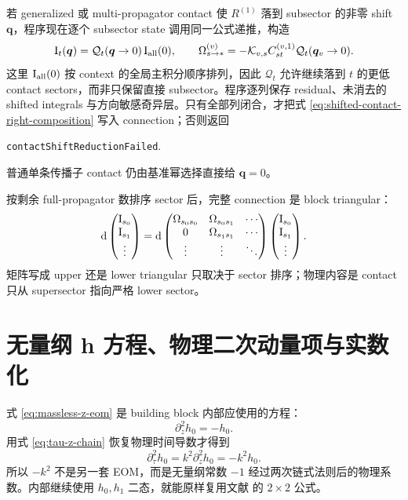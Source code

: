 \documentclass[11pt,a4paper]{ctexart}
\newcommand{\dd}{\mathrm d}
\begin{document}
若 generalized 或 multi-propagator contact 使 $R^{(1)}$ 落到 subsector 的非零 shift $\bm q$，程序现在逐个 subsector state 调用同一公式递推，构造
\begin{equation}
 \bm{\text I}_t(\bm q)=\mathcal Q_t(\bm q\to0)\,\bm{\text I}_{\rm all}(0),
 \qquad
 \Omega_{s\to *}^{(v)}
 =-\mathcal K_{v,s}C_{st}^{(v,1)}\mathcal Q_t(\bm q_v\to0).
 \label{eq:shifted-contact-right-composition}
\end{equation}
这里 $\bm{\text I}_{\rm all}(0)$ 按 context 的全局主积分顺序排列，因此 $\mathcal Q_t$ 允许继续落到 $t$ 的更低 contact sectors，而非只保留直接 subsector。程序逐列保存 residual、未消去的 shifted integrals 与方向敏感奇异层。只有全部列闭合，才把式 \eqref{eq:shifted-contact-right-composition} 写入 connection；否则返回
\begin{center}
 \texttt{contactShiftReductionFailed}.
\end{center}
普通单条传播子 contact 仍由基准幂选择直接给 $\bm q=0$。

按剩余 full-propagator 数排序 sector 后，完整 connection 是 block triangular：
\begin{equation}
 \dd
 \begin{pmatrix}
 \bm{\text I}_{s_0}\\\bm{\text I}_{s_1}\\\vdots
 \end{pmatrix}
 =\dd
 \begin{pmatrix}
 \Omega_{s_0s_0}&\Omega_{s_0s_1}&\cdots\\
 0&\Omega_{s_1s_1}&\cdots\\
 \vdots&\vdots&\ddots
 \end{pmatrix}
 \begin{pmatrix}
 \bm{\text I}_{s_0}\\\bm{\text I}_{s_1}\\\vdots
 \end{pmatrix}.
 \label{eq:block-triangular-de}
\end{equation}
矩阵写成 upper 还是 lower triangular 只取决于 sector 排序；物理内容是 contact 只从 supersector 指向严格 lower sector。

\section{无量纲 h 方程、物理二次动量项与实数化}
\label{sec:physical-k2}

式 \eqref{eq:massless-z-eom} 是 building block 内部应使用的方程：
\begin{equation}
 \partial_z^2h_0=-h_0.
\end{equation}
用式 \eqref{eq:tau-z-chain} 恢复物理时间导数才得到
\begin{equation}
 \boxed{
 \partial_\tau^2h_0
 =k^2\partial_z^2h_0
 =-k^2h_0.
 }
 \label{eq:physical-second-derivative}
\end{equation}
所以 $-k^2$ 不是另一套 EOM，而是无量纲常数 $-1$ 经过两次链式法则后的物理系数。内部继续使用 $h_0,h_1$ 二态，就能原样复用文献 \cite{Chen:2023eic} 的 $2\times2$ 公式。
\end{document}
